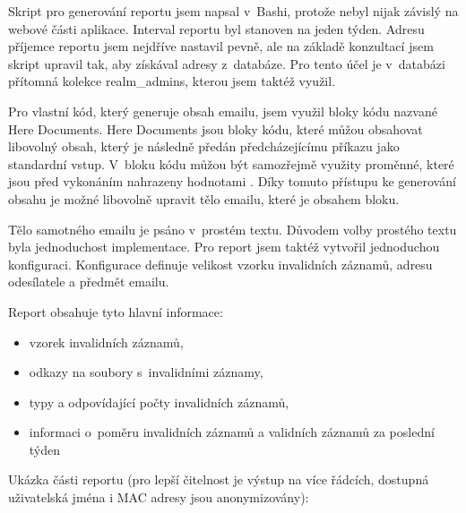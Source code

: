 \documentclass[thesis=M,czech]{FITthesis}[2012/06/26]
\begin{document}
      Skript pro generování reportu jsem napsal v~Bashi, protože nebyl nijak závislý na webové části aplikace.
      Interval reportu byl stanoven na jeden týden.
      Adresu příjemce reportu jsem nejdříve nastavil pevně, 
      ale na základě konzultací jsem skript upravil tak, aby získával adresy z~databáze.
      Pro tento účel je v~databázi přítomná kolekce realm\_admins, kterou jsem taktéž využil.

      Pro vlastní kód, který generuje obsah emailu, jsem využil bloky kódu nazvané Here Documents.
      Here Documents jsou bloky kódu, které můžou obsahovat libovolný obsah, který je následně předán
      předcházejícímu příkazu jako standardní vstup.
      V~bloku kódu můžou být samozřejmě využity proměnné, které jsou před vykonáním nahrazeny hodnotami \cite{here_docs}.
      Díky tomuto přístupu ke generování obsahu je možné libovolně upravit tělo emailu, které je obsahem bloku.

      Tělo samotného emailu je psáno v~prostém textu. 
      Důvodem volby prostého textu byla jednoduchost implementace.
      Pro report jsem taktéž vytvořil jednoduchou konfiguraci.
      Konfigurace definuje velikost vzorku invalidních záznamů, adresu odesílatele
      a předmět emailu.

      Report obsahuje tyto hlavní informace:
      \begin{itemize}
        \item{vzorek invalidních záznamů,}
        \item{odkazy na soubory s~invalidními záznamy,}
        \item{typy a odpovídající počty invalidních záznamů,}
        \item{informaci o~poměru invalidních záznamů a validních záznamů za poslední týden}
      \end{itemize}

      Ukázka části reportu (pro lepší čitelnost je výstup na více řádcích,
      dostupná uživatelská jména i MAC adresy jsou anonymizovány):
\end{document}
